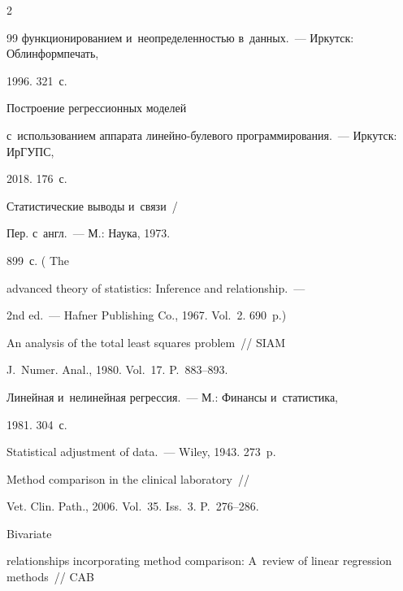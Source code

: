 \begin{multicols}{2}
{{\begin{thebibliography}{99}
функционированием и~неопределенностью в~данных.~--- Иркутск: Облинформпечать, 


1996. 321~с.




 Построение регрессионных моделей 


с~использованием аппарата линейно-бу\-ле\-во\-го программирования.~--- Иркутск: ИрГУПС, 


2018. 176~с.







 Статистические выводы и~связи~/


Пер. с~англ.~--- М.: Наука, 1973. 


899~с. ( The


advanced theory of statistics: Inference and relationship.~---


2nd ed.~--- Hafner Publishing Co., 1967. Vol.~2. 690~p.)




 An analysis of the total least squares problem~// SIAM 


J.~Numer. Anal., 1980. Vol.~17. P.~883--893.







 Линейная и~нелинейная регрессия.~--- М.: Финансы и~статистика, 


1981. 304~с.







 Statistical adjustment of data.~--- Wiley, 1943. 273~p.




 Method comparison in the clinical laboratory~// 


Vet. Clin. Path., 2006. Vol.~35. Iss.~3. P.~276--286.







 Bivariate 


relationships incorporating method comparison: A~review of linear regression methods~// CAB 



\end{thebibliography}}}
\end{multicols}
